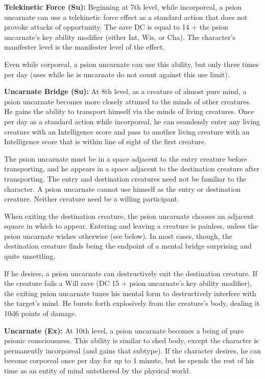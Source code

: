 \documentclass{article}
\begin{document}
\textbf{Telekinetic Force (Su):} Beginning at 7th level, while incorporeal, a psion 
uncarnate can use a telekinetic force effect as a standard action that does not 
provoke attacks of opportunity. The save DC is equal to 14 + the psion uncarnate's 
key ability modifier (either Int, Wis, or Cha). The character's manifester level 
is the manifester level of the effect.

Even while corporeal, a psion uncarnate can use this ability, but only three times 
per day (uses while he is uncarnate do not count against this use limit).

\textbf{Uncarnate Bridge (Su): }At 8th level, as a creature of almost pure mind, 
a psion uncarnate becomes more closely attuned to the minds of other creatures. 
He gains the ability to transport himself via the minds of living creatures. Once 
per day as a standard action while incorporeal, he can seamlessly enter any living 
creature with an Intelligence score and pass to another living creature with an 
Intelligence score that is within line of sight of the first creature.

The psion uncarnate must be in a space adjacent to the entry creature before transporting, 
and he appears in a space adjacent to the destination creature after transporting. 
The entry and destination creatures need not be familiar to the character. A psion 
uncarnate cannot use himself as the entry or destination creature. Neither creature 
need be a willing participant.

When exiting the destination creature, the psion uncarnate chooses an adjacent 
square in which to appear. Entering and leaving a creature is painless, unless 
the psion uncarnate wishes otherwise (see below). In most cases, though, the destination 
creature finds being the endpoint of a mental bridge surprising and quite unsettling.

If he desires, a psion uncarnate can destructively exit the destination creature. 
If the creature fails a Will save (DC 15 + psion uncarnate's key ability modifier), 
the exiting psion uncarnate tunes his mental form to destructively interfere with 
the target's mind. He bursts forth explosively from the creature's body, dealing 
it 10d6 points of damage.

\textbf{Uncarnate (Ex):} At 10th level, a psion uncarnate becomes a being of pure 
psionic consciousness. This ability is similar to shed body, except the character 
is permanently incorporeal (and gains that subtype). If the character desires, 
he can become corporeal once per day for up to 1 minute, but he spends the rest 
of his time as an entity of mind untethered by the physical world.
\end{document}

